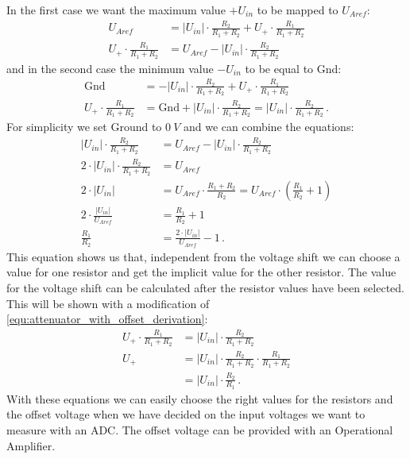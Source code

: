 In the first case we want the maximum value $+U_{in}$ to be mapped to $U_{Aref}$:
\begin{align}
	U_{Aref} &= \lvert U_{in} \rvert \cdot \frac{R_2}{R_1 + R_2} + U_+ \cdot \frac{R_1}{R_1 + R_2} \\
	U_+ \cdot \frac{R_1}{R_1 + R_2} &= U_{Aref} - \lvert U_{in} \rvert \cdot \frac{R_2}{R_1 + R_2}
\end{align}
and in the second case the minimum value $-U_{in}$ to be equal to Gnd:
\begin{align}
	\text{Gnd} &= - \lvert U_{in} \rvert \cdot \frac{R_2}{R_1 + R_2} + U_+ \cdot \frac{R_1}{R_1 + R_2} \\
	U_+ \cdot \frac{R_1}{R_1 + R_2} &= \text{Gnd} + \lvert U_{in} \rvert \cdot \frac{R_2}{R_1 + R_2} = \lvert U_{in} \rvert \cdot \frac{R_2}{R_1 + R_2}\,.
	\label{equ:attenuator_with_offset_derivation}
\end{align}
For simplicity we set Ground to $\SI{0}{V}$ and we can combine the equations:
\begin{align}
	\lvert U_{in} \rvert \cdot \frac{R_2}{R_1 + R_2} &= U_{Aref} - \lvert U_{in} \rvert \cdot \frac{R_2}{R_1 + R_2} \\
	2 \cdot \lvert U_{in} \rvert \cdot \frac{R_2}{R_1 + R_2} &= U_{Aref} \\
	2 \cdot \lvert U_{in} \rvert &= U_{Aref} \cdot \frac{R_1 + R_2}{R_2} = U_{Aref} \cdot \left( \frac{R_1}{R_2} + 1 \right) \\
	2 \cdot \frac{\lvert U_{in} \rvert}{U_{Aref}} &= \frac{R_1}{R_2} + 1 \\
	\frac{R_1}{R_2} &= \frac{2 \cdot \lvert U_{in} \rvert}{U_{Aref}} - 1\,.
\end{align}
This equation shows us that, independent from the voltage shift we can choose a value for one resistor and get the implicit value for the other resistor. The value for the voltage shift can be calculated after the resistor values have been selected. This will be shown with a modification of \cref{equ:attenuator_with_offset_derivation}:
\begin{align}
	U_+ \cdot \frac{R_1}{R_1 + R_2} &= \lvert U_{in} \rvert \cdot \frac{R_2}{R_1 + R_2} \\
	U_+ &= \lvert U_{in} \rvert \cdot \frac{R_2}{R_1 + R_2} \cdot \frac{R_1}{R_1 + R_2} \\
			&= \lvert U_{in} \rvert \cdot \frac{R_2}{R_1}\,.
\end{align}
With these equations we can easily choose the right values for the resistors and the offset voltage when we have decided on the input voltages we want to measure with an ADC. The offset voltage can be provided with an Operational Amplifier.

